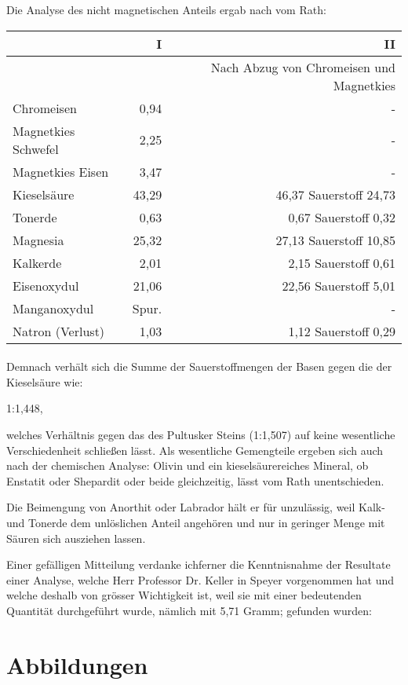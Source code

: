 \documentclass[a4paper, 11pt, oneside]{article}
\begin{document}
Die Analyse des nicht magnetischen Anteils ergab nach vom Rath:
\begin{center}
    \begin{tabular}{ |l|r|r| }
    \hline
    & I & II\\\hline
    & & Nach Abzug von Chromeisen und Magnetkies\\
    \hline\hline
    Chromeisen & 0,94 & -\\\hline
    Magnetkies Schwefel & 2,25 & -\\\hline
    Magnetkies Eisen & 3,47 & -\\\hline
    Kieselsäure & 43,29 & 46,37 Sauerstoff 24,73\\\hline
    Tonerde & 0,63 & 0,67 Sauerstoff 0,32\\\hline
    Magnesia & 25,32 & 27,13 Sauerstoff 10,85\\\hline
    Kalkerde & 2,01 & 2,15 Sauerstoff 0,61\\\hline
    Eisenoxydul & 21,06 & 22,56 Sauerstoff 5,01\\\hline
    Manganoxydul & Spur. & -\\\hline
    Natron (Verlust) & 1,03 & 1,12 Sauerstoff 0,29\\
    \hline
    \end{tabular}
\end{center}
\paragraph{}
Demnach verhält sich die Summe der Sauerstoffmengen der Basen gegen die der Kieselsäure wie:

1:1,448,

welches Verhältnis gegen das des Pultusker Steins (1:1,507) auf keine wesentliche Verschiedenheit schließen lässt. Als wesentliche Gemengteile ergeben sich auch nach der chemischen Analyse: Olivin und ein kieselsäurereiches Mineral, ob Enstatit oder Shepardit oder beide gleichzeitig, lässt vom Rath unentschieden.

Die Beimengung von Anorthit oder Labrador hält er für unzulässig, weil Kalk- und Tonerde dem unlöslichen Anteil angehören und nur in geringer Menge mit Säuren sich ausziehen lassen.

Einer gefälligen Mitteilung verdanke ichferner die Kenntnisnahme der Resultate einer Analyse, welche Herr Professor Dr. Keller in Speyer vorgenommen hat und welche deshalb von grösser Wichtigkeit ist, weil sie mit einer bedeutenden Quantität durchgeführt wurde, nämlich mit 5,71 Gramm; gefunden wurden:
\clearpage
\section{Abbildungen}
\clearpage
\pagestyle{fancy}
\fancyhf{}
\cfoot{\thepage}
\begin{figure}[t]
\centering
\end{figure}
\clearpage
{}
\begin{figure}[t]
\centering
\end{figure}
\clearpage
\end{document}
